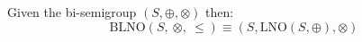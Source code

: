 Given the bi-semigroup $(S , \oplus, \otimes)$ then:
\[
\mathrm{BLNO}(S,\ \otimes,\ \leq) \equiv (S, \mathrm{LNO}(S, \oplus), \otimes)
\]
